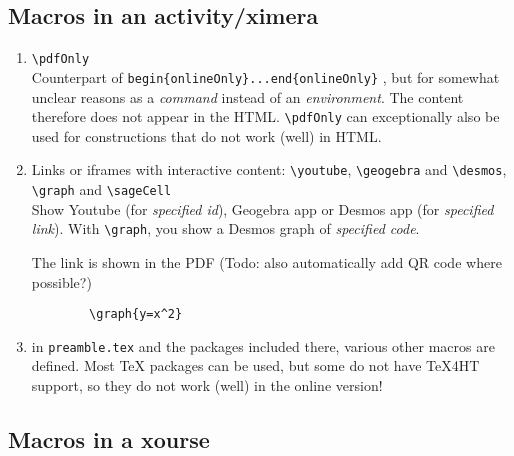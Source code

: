 \documentclass{ximera}
\begin{document}
    \author{Wim Obbels}
    \label{xim:ximeraCommands}

\subsection{Macros in an activity/ximera}


\begin{enumerate}
    \item \verb|\pdfOnly|
      \\
     Counterpart of 
       \verb|begin{onlineOnly}...end{onlineOnly}|
       , but for somewhat unclear reasons as a \textit{command} instead of an \textit{environment}. The content therefore does not appear in the HTML. 
     \verb|\pdfOnly| can exceptionally also be used for constructions that do not work (well) in HTML.


    \item Links or iframes with interactive content: \verb|\youtube|, \verb|\geogebra|  and \verb|\desmos|, \verb|\graph| and \verb|\sageCell|
    \\
    Show Youtube (for \textit{specified id}), Geogebra app or Desmos app (for \textit{specified link}).
    With \verb|\graph|, you show a Desmos graph of \textit{specified code}.

    The link is shown in the PDF (Todo: also automatically add QR code where possible?)

    \begin{verbatim}    
        \graph{y=x^2}
    \end{verbatim}

    \item in \verb|preamble.tex| and the packages included there, various other macros are defined. Most TeX packages can be used, but some do not have TeX4HT support, so they do not work (well) in the online version!

\end{enumerate}

\subsection{Macros in a xourse}
\end{document}
